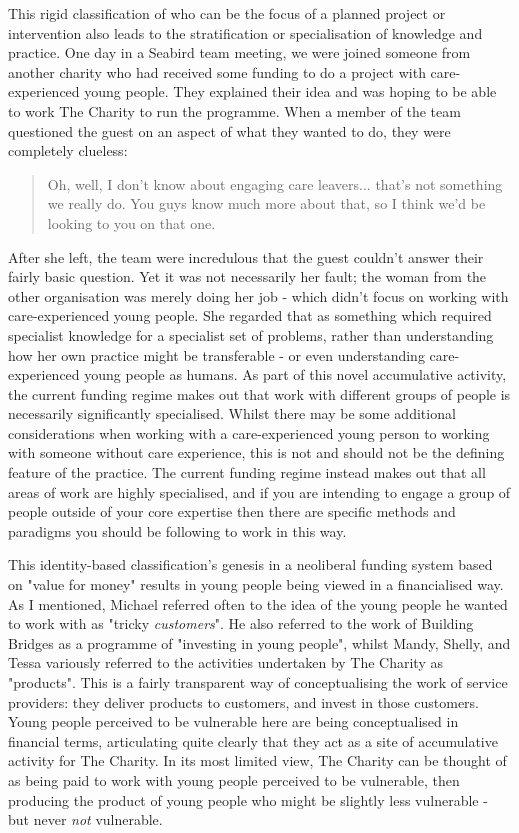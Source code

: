 This rigid classification of who can be the focus of a planned project or intervention also leads to the stratification or specialisation of knowledge and practice. One day in a Seabird team meeting, we were joined someone from another charity who had received some funding to do a project with care-experienced young people. They explained their idea and was hoping to be able to work The Charity to run the programme. When a member of the team questioned the guest on an aspect of what they wanted to do, they were completely clueless:
\begin{quote}
Oh, well, I don't know about engaging care leavers... that's not something we really do. You guys know much more about that, so I think we'd be looking to you on that one.
\end{quote}
After she left, the team were  incredulous that the guest couldn't answer their fairly basic question. Yet it was not necessarily her fault; the woman from the other organisation was merely doing her job - which didn't focus on working with care-experienced young people. She regarded that as something which required specialist knowledge for a specialist set of problems, rather than understanding how her own practice might be transferable - or even understanding care-experienced young people as humans. As part of this novel accumulative activity, the current funding regime makes out that work with different groups of people is necessarily significantly specialised. Whilst there may be some additional considerations when working with a care-experienced young person to working with someone without care experience, this is not and should not be the defining feature of the practice. The current funding regime instead makes out that all areas of work are highly specialised, and if you are intending to engage a group of people outside of your core expertise then there are specific methods and paradigms you should be following to work in this way. 

This identity-based classification's genesis in a neoliberal funding system based on "value for money" results in young people being viewed in a financialised way. As I mentioned, Michael referred often to the idea of the young people he wanted to work with as "tricky \emph{customers}". He also referred to the work of Building Bridges as a programme of "investing in young people", whilst Mandy, Shelly, and Tessa variously referred to the activities undertaken by The Charity as "products". This is a fairly transparent way of conceptualising the work of service providers: they deliver products to customers, and invest in those customers. Young people perceived to be vulnerable here are being conceptualised in financial terms, articulating quite clearly that they act as a site of accumulative activity for The Charity. In its most limited view, The Charity can be thought of as being paid to work with young people perceived to be vulnerable, then producing the product of young people who might be slightly less vulnerable - but never \textit{not} vulnerable.

